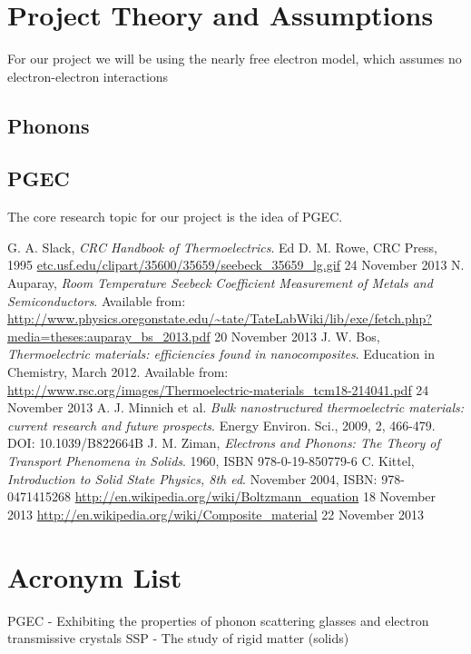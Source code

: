 \documentclass[a4paper,10pt,journal]{IEEEtran}
\begin{document}
\section{Project Theory and Assumptions}
For our project we will be using the nearly free electron model, which
assumes no electron-electron interactions

\subsection{Phonons}

\subsection{\acf{PGEC}}
The core research topic for our project is the idea of PGEC.


\begin{thebibliography}{2}
G. A. Slack, \emph{CRC Handbook of Thermoelectrics}. Ed D. M. Rowe, CRC Press, 1995
\url{etc.usf.edu/clipart/35600/35659/seebeck_35659_lg.gif} 24 November
2013
N. Auparay, \emph{Room Temperature Seebeck Coefficient Measurement
of Metals and Semiconductors}. Available
from:
\url{http://www.physics.oregonstate.edu/~tate/TateLabWiki/lib/exe/fetch.php?media=theses:auparay_bs_2013.pdf} 20 November 2013
J. W. Bos, \emph{Thermoelectric materials: efficiencies found in
nanocomposites}. Education in Chemistry, March 2012. Available
from:
\url{http://www.rsc.org/images/Thermoelectric-materials_tcm18-214041.pdf} 24 November 2013
A. J. Minnich et al. \emph{Bulk nanostructured thermoelectric
materials: current research and future prospects}. Energy Environ.
Sci., 2009, 2, 466-479. DOI: 10.1039/B822664B
J. M. Ziman, \emph{Electrons and Phonons: The Theory of Transport
Phenomena in Solids}. 1960, ISBN 978-0-19-850779-6
C. Kittel, \emph{Introduction to Solid State Physics, 8th ed}. November 2004, ISBN: 978-0471415268
\url{http://en.wikipedia.org/wiki/Boltzmann_equation} 18 November 2013
\url{http://en.wikipedia.org/wiki/Composite_material} 22 November 2013
\end{thebibliography}

\newpage
\appendix
\section{Acronym List}
\acresetall
\ac{PGEC} - Exhibiting the properties of phonon scattering glasses and
electron transmissive crystals
\ac{SSP} - The study of rigid matter (solids)
\end{document}
